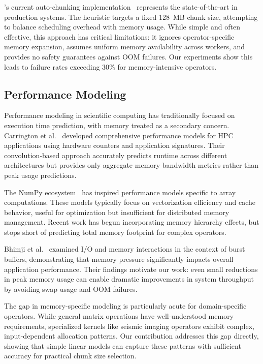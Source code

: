 \dask's current auto-chunking implementation~\cite{rocklin2015dask} represents the state-of-the-art in production systems.
The heuristic targets a fixed 128~MB chunk size, attempting to balance scheduling overhead with memory usage.
While simple and often effective, this approach has critical limitations: it ignores operator-specific memory expansion, assumes uniform memory availability across workers, and provides no safety guarantees against OOM failures.
Our experiments show this leads to failure rates exceeding 30\% for memory-intensive operators.

\subsection{Performance Modeling}


Performance modeling in scientific computing has traditionally focused on execution time prediction, with memory treated as a secondary concern.
Carrington et al.~\cite{carrington2006} developed comprehensive performance models for \ac{HPC} applications using hardware counters and application signatures.
Their convolution-based approach accurately predicts runtime across different architectures but provides only aggregate memory bandwidth metrics rather than peak usage predictions.

The NumPy ecosystem~\cite{harris2020} has inspired performance models specific to array computations.
These models typically focus on vectorization efficiency and cache behavior, useful for optimization but insufficient for distributed memory management.
Recent work has begun incorporating memory hierarchy effects, but stops short of predicting total memory footprint for complex operators.

Bhimji et al.~\cite{bhimji2016} examined I/O and memory interactions in the context of burst buffers, demonstrating that memory pressure significantly impacts overall application performance.
Their findings motivate our work: even small reductions in peak memory usage can enable dramatic improvements in system throughput by avoiding swap usage and OOM failures.

The gap in memory-specific modeling is particularly acute for domain-specific operators.
While general matrix operations have well-understood memory requirements, specialized kernels like seismic imaging operators exhibit complex, input-dependent allocation patterns.
Our contribution addresses this gap directly, showing that simple linear models can capture these patterns with sufficient accuracy for practical chunk size selection.

